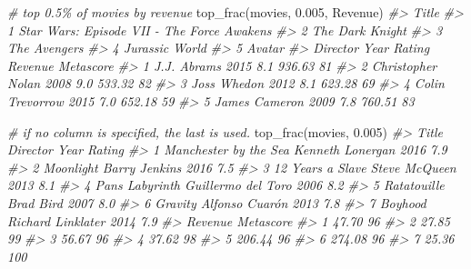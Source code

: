 \documentclass[
]{book}
\newenvironment{Shaded}{\begin{snugshade}}{\end{snugshade}}
\newcommand{\CommentTok}[1]{\textcolor[rgb]{0.56,0.35,0.01}{\textit{#1}}}
\newcommand{\FloatTok}[1]{\textcolor[rgb]{0.00,0.00,0.81}{#1}}
\newcommand{\FunctionTok}[1]{\textcolor[rgb]{0.00,0.00,0.00}{#1}}
\newcommand{\NormalTok}[1]{#1}
\begin{document}
\begin{Shaded}
\begin{Highlighting}[]
\CommentTok{\# top 0.5\% of movies by revenue}
\FunctionTok{top\_frac}\NormalTok{(movies, }\FloatTok{0.005}\NormalTok{, Revenue)}
\CommentTok{\#\textgreater{}                                        Title}
\CommentTok{\#\textgreater{} 1 Star Wars: Episode VII {-} The Force Awakens}
\CommentTok{\#\textgreater{} 2                            The Dark Knight}
\CommentTok{\#\textgreater{} 3                               The Avengers}
\CommentTok{\#\textgreater{} 4                             Jurassic World}
\CommentTok{\#\textgreater{} 5                                     Avatar}
\CommentTok{\#\textgreater{}            Director Year Rating Revenue Metascore}
\CommentTok{\#\textgreater{} 1       J.J. Abrams 2015    8.1  936.63        81}
\CommentTok{\#\textgreater{} 2 Christopher Nolan 2008    9.0  533.32        82}
\CommentTok{\#\textgreater{} 3       Joss Whedon 2012    8.1  623.28        69}
\CommentTok{\#\textgreater{} 4   Colin Trevorrow 2015    7.0  652.18        59}
\CommentTok{\#\textgreater{} 5     James Cameron 2009    7.8  760.51        83}

\CommentTok{\# if no column is specified, the last is used.}
\FunctionTok{top\_frac}\NormalTok{(movies, }\FloatTok{0.005}\NormalTok{)}
\CommentTok{\#\textgreater{}                   Title           Director Year Rating}
\CommentTok{\#\textgreater{} 1 Manchester by the Sea   Kenneth Lonergan 2016    7.9}
\CommentTok{\#\textgreater{} 2             Moonlight      Barry Jenkins 2016    7.5}
\CommentTok{\#\textgreater{} 3      12 Years a Slave      Steve McQueen 2013    8.1}
\CommentTok{\#\textgreater{} 4       Pan\textquotesingle{}s Labyrinth Guillermo del Toro 2006    8.2}
\CommentTok{\#\textgreater{} 5           Ratatouille          Brad Bird 2007    8.0}
\CommentTok{\#\textgreater{} 6               Gravity     Alfonso Cuarón 2013    7.8}
\CommentTok{\#\textgreater{} 7               Boyhood  Richard Linklater 2014    7.9}
\CommentTok{\#\textgreater{}   Revenue Metascore}
\CommentTok{\#\textgreater{} 1   47.70        96}
\CommentTok{\#\textgreater{} 2   27.85        99}
\CommentTok{\#\textgreater{} 3   56.67        96}
\CommentTok{\#\textgreater{} 4   37.62        98}
\CommentTok{\#\textgreater{} 5  206.44        96}
\CommentTok{\#\textgreater{} 6  274.08        96}
\CommentTok{\#\textgreater{} 7   25.36       100}
\end{Highlighting}
\end{Shaded}
\end{document}
